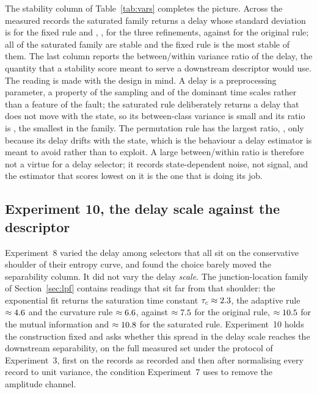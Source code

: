 \documentclass[10pt,a4paper,twocolumn]{article}
\begin{document}
The stability column of Table~\ref{tab:vars} completes the picture.  Across
the measured records the saturated family returns a delay whose standard
deviation is \varRotorStdLPF{} for the fixed rule and \varRotorStdCURV{},
\varRotorStdFIT{}, \varRotorStdADP{} for the three refinements, against
\varRotorStdSE{} for the original rule; all of the saturated family are stable
and the fixed rule is the most stable of them.  The last column reports the
between/within variance ratio of the delay, the quantity that a stability
score meant to serve a downstream descriptor would use.  The reading is made
with the design in mind.  A delay is a preprocessing parameter, a property of
the sampling and of the dominant time scales rather than a feature of the
fault; the saturated rule deliberately returns a delay that does not move with
the state, so its between-class variance is small and its ratio is
\varRatioLPF{}, the smallest in the family.  The permutation rule has the
largest ratio, \varRatioPE{}, only because its delay drifts with the state,
which is the behaviour a delay estimator is meant to avoid rather than to
exploit.  A large between/within ratio is therefore not a virtue for a delay
selector; it records state-dependent noise, not signal, and the estimator
that scores lowest on it is the one that is doing its job.

\begin{table}[t]
\centering
\caption{Estimator variants against the review's Path-1 refinements.  Chaos
$\tau$ error is the mean relative delay error on the five clean chaotic
systems; noise $\tau$ error is the same quantity under $10$~dB additive
noise.  Rotor $\tau$ std is the standard deviation of the delay over the
$180$ measured records, and the stability ratio is the between-class to
within-class variance of the delay over the four states.}
\label{tab:vars}
\scriptsize

\end{table}

\subsection{Experiment 10, the delay scale against the descriptor}
\label{sec:exp10}

Experiment~8 varied the delay among selectors that all sit on the conservative
shoulder of their entropy curve, and found the choice barely moved the
separability column.  It did not vary the delay \emph{scale}.  The
junction-location family of Section~\ref{sec:lpf} contains readings that sit
far from that shoulder: the exponential fit returns the saturation time
constant $\tau_c \approx 2.3$, the adaptive rule
$\approx 4.6$ and the curvature rule $\approx 6.6$, against
$\approx 7.5$ for the original rule, $\approx 10.5$ for the
mutual information and $\approx 10.8$ for the saturated rule.
Experiment~10 holds the construction fixed and asks whether this spread in the
delay scale reaches the downstream separability, on the full measured set under
the protocol of Experiment~3, first on the records as recorded and then after
normalising every record to unit variance, the condition Experiment~7 uses to
remove the amplitude channel.
\end{document}
